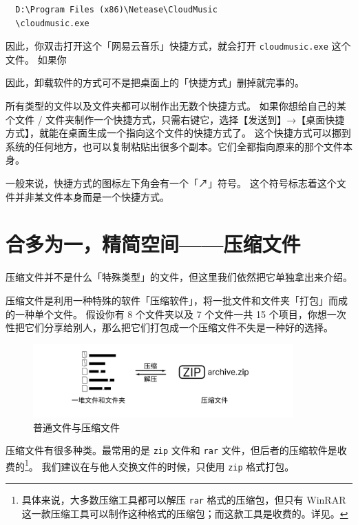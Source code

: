 \begin{verbatim}
  D:\Program Files (x86)\Netease\CloudMusic
  \cloudmusic.exe
\end{verbatim}

因此，你双击打开这个「网易云音乐」快捷方式，就会打开 \verb|cloudmusic.exe| 这个文件。
如果你

\begin{note}
  因此，卸载软件的方式可不是把桌面上的「快捷方式」删掉就完事的。
\end{note}

所有类型的文件以及文件夹都可以制作出无数个快捷方式。
如果你想给自己的某个文件 / 文件夹制作一个快捷方式，只需右键它，选择【发送到】→【桌面快捷方式】，就能在桌面生成一个指向这个文件的快捷方式了。
这个快捷方式可以挪到系统的任何地方，也可以复制粘贴出很多个副本。它们全都指向原来的那个文件本身。

一般来说，快捷方式的图标左下角会有一个「↗」符号。
这个符号标志着这个文件并非某文件本身而是一个快捷方式。

\section{合多为一，精简空间——压缩文件}

压缩文件并不是什么「特殊类型」的文件，但这里我们依然把它单独拿出来介绍。

压缩文件是利用一种特殊的软件「压缩软件」，将一批文件和文件夹「打包」而成的一种单个文件。
假设你有 8 个文件夹以及 7 个文件一共 15 个项目，你想一次性把它们分享给别人，那么把它们打包成一个压缩文件不失是一种好的选择。

\begin{figure}[htb!]
  \centering
  \includegraphics[width=10cm]{assets/Compress.png}
  \caption{普通文件与压缩文件}
  \label{Compress}
\end{figure}

压缩文件有很多种类。最常用的是 \verb|zip| 文件和 \verb|rar| 文件，但后者的压缩软件是收费的\footnote{具体来说，大多数压缩工具都可以解压 \texttt{rar} 格式的压缩包，但只有 WinRAR 这一款压缩工具可以制作这种格式的压缩包；而这款工具是收费的。详见。}。
我们建议在与他人交换文件的时候，只使用 \verb|zip| 格式打包。

